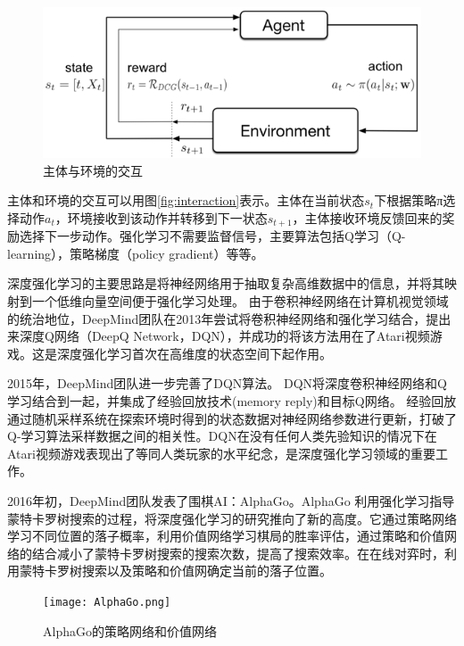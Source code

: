 \begin{figure}[!htbp]
\vspace{1em}
\centering
  \includegraphics[width=0.8\linewidth]{figures/interaction.png}
  \caption{主体与环境的交互}
  \label{fig:LSTM-DSSM}       %
\vspace{1em}
\end{figure}

主体和环境的交互可以用图\ref{fig:interaction}表示。主体在当前状态$s_t$下根据策略π选择动作$a_t$，环境接收到该动作并转移到下一状态$s_{t+1}$，主体接收环境反馈回来的奖励选择下一步动作。强化学习不需要监督信号，主要算法包括Q学习（Q-learning），策略梯度（policy gradient）等等。

深度强化学习的主要思路是将神经网络用于抽取复杂高维数据中的信息，并将其映射到一个低维向量空间便于强化学习处理。
由于卷积神经网络在计算机视觉领域的统治地位，DeepMind团队在2013年尝试将卷积神经网络和强化学习结合，提出来深度Q网络（DeepQ Network，DQN）\cite{Mnih2013PlayingAW}，并成功的将该方法用在了Atari视频游戏。这是深度强化学习首次在高维度的状态空间下起作用。

2015年，DeepMind团队进一步完善了DQN算法\cite{Mnih2015HumanlevelCT}。
DQN将深度卷积神经网络和Q学习结合到一起，并集成了经验回放技术(memory reply)和目标Q网络。
经验回放通过随机采样系统在探索环境时得到的状态数据对神经网络参数进行更新，打破了Q-学习算法采样数据之间的相关性。DQN在没有任何人类先验知识的情况下在Atari视频游戏表现出了等同人类玩家的水平纪念，是深度强化学习领域的重要工作。

2016年初，DeepMind团队发表了围棋AI：AlphaGo\cite{Silver2016MasteringTG}。AlphaGo 利用强化学习指导蒙特卡罗树搜索的过程，将深度强化学习的研究推向了新的高度。它通过策略网络学习不同位置的落子概率，利用价值网络学习棋局的胜率评估，通过策略和价值网络的结合减小了蒙特卡罗树搜索的搜索次数，提高了搜索效率。在在线对弈时，利用蒙特卡罗树搜索以及策略和价值网确定当前的落子位置。

\begin{figure}[!htbp]\centering
\vspace{1em}
  \texttt{[image: AlphaGo.png]}
  \caption{AlphaGo的策略网络和价值网络}  \label{fig:AlphaGo}       %
\vspace{1em}
\end{figure}

